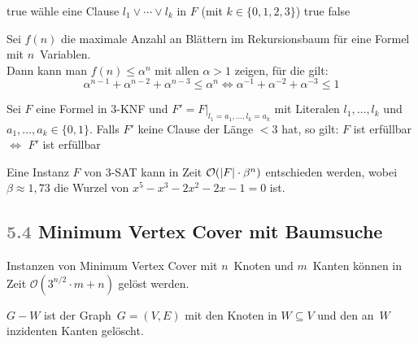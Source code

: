 \documentclass{cheat-sheet}
\newcommand{\size}[1]{\abs{#1}} %
\renewcommand{\O}{\mathcal{O}} %
\newcommand{\Problem}[1]{\textcolor{ProblemColor}{\textbf{#1}}}
\newcommand{\scriptSection}[1]{\textcolor{gray}{#1}\enspace}
\begin{document}
\begin{algorithmic}
      \Return true
    \EndIf
    \State wähle eine Clause $l_1 \vee \cdots \vee l_k$ in $F$ (mit $k \in \{ 0, 1, 2, 3 \}$)
        \Return true
      \EndIf
    \EndFor
    \State \Return false
  \EndFunction
\end{algorithmic}

\begin{beweisskizze}
  Sei $f(n)$ die maximale Anzahl an Blättern im Rekursionsbaum für eine Formel mit $n$~Variablen. \\
  Dann kann man $f(n) \leq \alpha^n$ mit allen $\alpha > 1$ zeigen, für die gilt:
  \[
    \alpha^{n-1} + \alpha^{n-2} + \alpha^{n-3} \leq \alpha^n \iff
    \alpha^{-1} + \alpha^{-2} + \alpha^{-3} \leq 1
  \]
\end{beweisskizze}

\begin{lem}
  Sei $F$ eine Formel in 3-KNF und $F' = F|_{l_1=a_1, \ldots, l_k=a_k}$ mit Literalen $l_1, \ldots, l_k$ und $a_1, \ldots, a_k \in \{ 0, 1 \}$.
  Falls $F'$ keine Clause der Länge $< 3$ hat, so gilt: $F$ ist erfüllbar $\iff$ $F'$ ist erfüllbar
\end{lem}

\begin{satz}
  Eine Instanz $F$ von 3-SAT kann in Zeit $\O(\size{F} \cdot \beta^n)$ entschieden werden, wobei $\beta \approx 1,73$ die Wurzel von $x^5 - x^3 - 2 x^2  - 2 x - 1 = 0$ ist.
\end{satz}

\subsection{\scriptSection{5.4} \Problem{Minimum Vertex Cover} mit Baumsuche}

\begin{satz}
  Instanzen von Minimum Vertex Cover mit $n$~Knoten und $m$~Kanten können in Zeit $\O(3^{n/2} \cdot m + n)$ gelöst werden.
\end{satz}

\begin{nota}
  $G - W$ ist der Graph~$G = (V, E)$ mit den Knoten in $W \subseteq V$ und den an~$W$ inzidenten Kanten gelöscht.
\end{nota}
\end{document}
